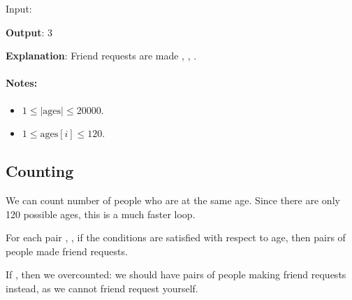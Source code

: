 \begin{flushleft}
Input: \fcj{[20,30,100,110,120]}

\textbf{Output}: 3

\textbf{Explanation}: Friend requests are made , , .
\end{flushleft}

 

\paragraph{Notes:}

\begin{itemize}
\item $1 \leq \lvert \text{ages}\rvert \leq 20000$.
\item $1 \leq \text{ages}[i] \leq 120$.
\end{itemize}

\subsection{Counting}
We can count number of people who are at the same age. Since there are only 120 possible ages, this is a much faster loop.

For each pair , , if the conditions are satisfied with respect to age, then  pairs of people made friend requests.

If , then we overcounted: we should have  pairs of people making friend requests instead, as we cannot friend request yourself.

\setcounter{lstlisting}{0}





